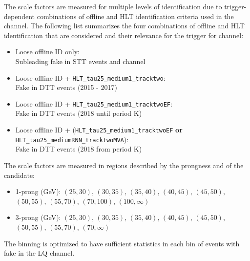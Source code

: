 


The scale factors are measured for multiple levels of \tauhad identification due to trigger-dependent combinations of
offline and HLT \tauhad identification criteria used in the \hadhad channel. The following list summarizes the four combinations of 
offline and HLT \tauhad identification that are considered and their relevance for the trigger for \hadhad channel:
\begin{itemize}
\item Loose offline \tauhad ID only:\\
  Subleading fake \tauhad in STT events and \lephad channel
\item Loose offline \tauhad ID + \verb|HLT_tau25_medium1_tracktwo|:\\
  Fake \tauhad in DTT events (2015 - 2017)
\item Loose offline \tauhad ID + \verb|HLT_tau25_medium1_tracktwoEF|:\\
  Fake \tauhad in DTT events (2018 until period K)
\item Loose offline \tauhad ID + (\verb|HLT_tau25_medium1_tracktwoEF|
  \textbf{or} \verb|HLT_tau25_mediumRNN_tracktwoMVA|):\\
  Fake \tauhad in DTT events (2018 from period K)
\end{itemize}

The scale factors are measured in regions described by the prongness and \pT of the \tauhad candidate:
\begin{itemize}
\item 1-prong \tauhad \pT (GeV): $(25, 30)$, $(30, 35)$, $(35, 40)$, $(40, 45)$, $(45, 50)$, $(50, 55)$, $(55, 70)$, $(70, 100)$, $(100, \infty)$
\item 3-prong \tauhad \pT (GeV): $(25, 30)$, $(30, 35)$, $(35, 40)$, $(40, 45)$, $(45, 50)$, $(50, 55)$, $(55, 70)$, $(70, \infty)$
\end{itemize}
The binning is optimized to have sufficient statistics in each bin of \ttbar events with fake \tauhad in the LQ \hadhad channel.

